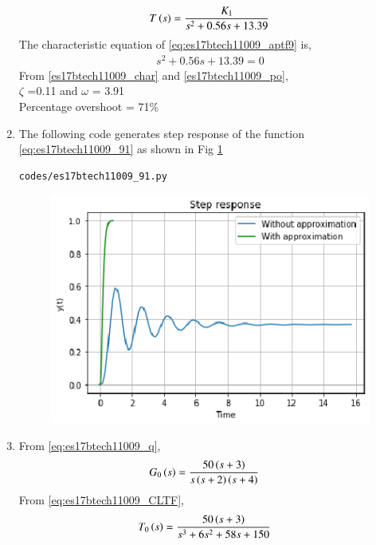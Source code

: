 \begin{enumerate}[label=\thesection.\arabic*.,ref=\thesection.\theenumi]
\begin{align}
    T\brak{s}= \frac{K_1}{s^2 + 0.56s + 13.39}
    \label{eq:es17btech11009_aptf9}
\end{align}
The characteristic equation of \eqref{eq:es17btech11009_aptf9} is,
\begin{align}
s^2 + 0.56s + 13.39=0
 \end{align}
From \eqref{es17btech11009_char} and \eqref{es17btech11009_po},
\\
 $\zeta$ =0.11 and $\omega$ = 3.91
 \\
 Percentage overshoot = 71\%

 \item
The following code generates step response of the function \eqref{eq:es17btech11009_91} as shown in Fig \ref{fig:es17btech11009_fig91}
\begin{lstlisting}
codes/es17btech11009_91.py
\end{lstlisting}
\begin{figure}[!h]
\centering
\includegraphics[width=\columnwidth]{./figs/es17btech11009_91.eps}
\caption{}
\label{fig:es17btech11009_fig91}
\end{figure}
\item
From \eqref{eq:es17btech11009_q},
\begin{align}
G_0\brak{s} &=\frac{50\brak{s+3}}{s\brak{s+2}\brak{s+4}}
\label{eq:es17btech11009_jj}
\end{align}
\solution
From \eqref{eq:es17btech11009_CLTF},
\begin{align}
T_0\brak{s} &=\frac{50\brak{s+3}}{s^3 + 6s^2 + 58s +150}
\label{eq:es17btech11009_101}
\end{align}
 

\end{enumerate}
